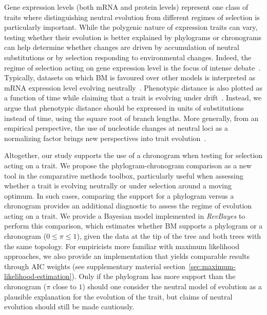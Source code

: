 \documentclass{article}
\newcommand{\PhyloSupport}{\pi}
\begin{document}
Gene expression levels (both mRNA and protein levels) represent one class of traits where distinguishing neutral evolution from different regimes of selection is particularly important.
While the polygenic nature of expression traits can vary, testing whether their evolution is better explained by phylograms or chronograms can help determine whether changes are driven by accumulation of neutral substitutions or by selection responding to environmental changes.
Indeed, the regime of selection acting on gene expression level is the focus of intense debate~\citep{signor_evolution_2018, price_detecting_2022, bertram_cagee_2023, dimayacyac_evaluating_2023}.
Typically, datasets on which BM is favoured over other models is interpreted as mRNA expression level evolving neutrally~\citep{khaitovich_evolution_2006, catalan_drift_2019, dimayacyac_evaluating_2023}.
Phenotypic distance is also plotted as a function of time while claiming that a trait is evolving under drift~\citep{jiang_decoupling_2023}.
Instead, we argue that phenotypic distance should be expressed in units of substitutions instead of time, using the square root of branch lengths.
More generally, from an empirical perspective, the use of nucleotide changes at neutral loci as a normalizing factor brings new perspectives into trait evolution~\citep{latrille_detecting_2024}.

Altogether, our study supports the use of a chronogram when testing for selection acting on a trait.
We propose the phylogram-chronogram comparison as a new tool in the comparative methods toolbox, particularly useful when assessing whether a trait is evolving neutrally or under selection around a moving optimum.
In such cases, comparing the support for a phylogram versus a chronogram provides an additional diagnostic to assess the regime of evolution acting on a trait.
We provide a Bayesian model implemented in \textit{RevBayes} to perform this comparison, which estimates whether BM supports a phylogram or a chronogram ($0 \leq \PhyloSupport \leq 1$), given the data at the tip of the tree and both trees with the same topology.
For empiricists more familiar with maximum likelihood approaches, we also provide an implementation that yields comparable results through AIC weights (see supplementary material section~\ref{sec:maximum-likelihood-estimation}).
Only if the phylogram has more support than the chronogram ($\PhyloSupport$ close to $1$) should one consider the neutral model of evolution as a plausible explanation for the evolution of the trait, but claims of neutral evolution should still be made cautiously.
\end{document}

